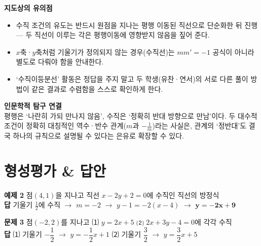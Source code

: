 \documentclass[11pt,a4paper]{article}
\begin{document}
\vspace{8pt}
\begin{minipage}[t]{0.48\linewidth}
\begin{calloutbox}
\textbf{지도상의 유의점}
\begin{itemize}[leftmargin=1.2em, itemsep=2pt, topsep=4pt]
  \item 수직 조건의 유도는 반드시 원점을 지나는 평행 이동된 직선으로 단순화한 뒤 진행 --- 두 직선이 이루는 각은 평행이동에 영향받지 않음을 짚어 준다.
  \item $x$축·$y$축처럼 기울기가 정의되지 않는 경우(수직선)는 $mm'=-1$ 공식이 아니라 별도로 다뤄야 함을 안내한다.
  \item `수직이등분선' 활동은 정답을 주지 말고 두 학생(유찬·연서)의 서로 다른 풀이 방법이 같은 결과로 수렴함을 스스로 확인하게 한다.
\end{itemize}
\end{calloutbox}
\end{minipage}\hfill
\begin{minipage}[t]{0.48\linewidth}
\begin{notebox}
\textbf{인문학적 탐구 연결}\\
평행은 `나란히 가되 만나지 않음', 수직은 `정확히 반대 방향으로 만남'이다. 두 대수적 조건이 정확히 대칭적인 역수·반수 관계($m$과 $-\frac{1}{m}$)라는 사실은, 관계의 `정반대'도 결국 하나의 규칙으로 설명될 수 있다는 은유로 확장할 수 있다.
\end{notebox}
\end{minipage}

\section{형성평가 \& 답안}

\begin{answerbox}
\textbf{예제 2} \quad 점$(4,1)$을 지나고 직선 $x-2y+2=0$에 수직인 직선의 방정식\\
\textbf{\color{goldstrong}답} \; 기울기 $\frac{1}{2}$에 수직 $\to$ $m=-2$ $\to$ $y-1=-2(x-4)$ $\to$ $\boldsymbol{y=-2x+9}$
\end{answerbox}

\begin{answerbox}
\textbf{문제 3} \quad 점$(-2,2)$를 지나고 ⑴ $y=2x+5$ \quad ⑵ $2x+3y-4=0$에 각각 수직\\
\textbf{\color{goldstrong}답} \; ⑴ 기울기 $-\dfrac{1}{2}$ $\to$ $y=-\dfrac{1}{2}x+1$ \qquad ⑵ 기울기 $\dfrac{3}{2}$ $\to$ $y=\dfrac{3}{2}x+5$
\end{answerbox}
\end{document}
